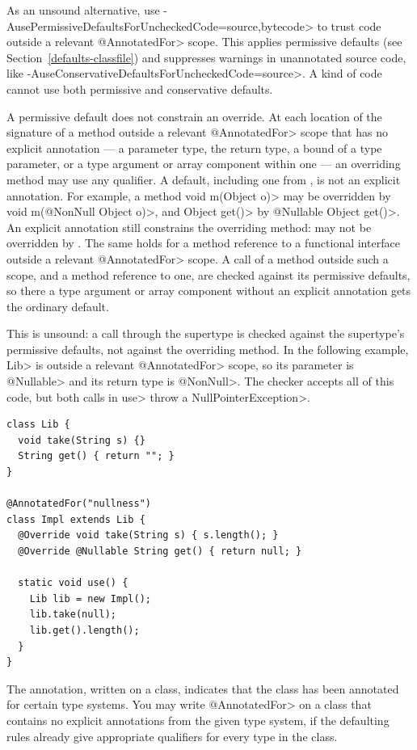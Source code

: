 As an unsound alternative, use
\<-AusePermissiveDefaultsForUncheckedCode=source,bytecode> to trust code outside
a relevant \<@AnnotatedFor> scope.  This applies permissive defaults (see
Section~\ref{defaults-classfile}) and suppresses warnings in unannotated source code,
like \<-AuseConservativeDefaultsForUncheckedCode=source>.  A kind of code cannot
use both permissive and conservative defaults.

A permissive default does not constrain an override.  At each location of the
signature of a method outside a relevant \<@AnnotatedFor> scope that has no
explicit annotation --- a parameter type, the return type, a bound of a type
parameter, or a type argument or array component within one --- an
overriding method may use any qualifier.  A default, including one from
, is not an explicit
annotation.  For example, a method
\<void m(Object o)> may be overridden by \<void m(@NonNull Object o)>, and
\<Object get()> by \<@Nullable Object get()>.  An explicit annotation still
constrains the overriding method:   may
not be overridden by .  The same holds for a method
reference to a functional interface outside a relevant \<@AnnotatedFor>
scope.  A call of a method outside such a scope, and a method reference to one,
are checked against its permissive defaults, so there a type argument or array
component without an explicit annotation gets the ordinary default.

This is unsound:  a call through the supertype is checked against the
supertype's permissive defaults, not against the overriding method.  In the
following example, \<Lib> is outside a relevant \<@AnnotatedFor> scope, so
its parameter is \<@Nullable> and its return type is \<@NonNull>.  The
checker accepts all of this code, but both calls in \<use> throw a
\<NullPointerException>.

\begin{Verbatim}
class Lib {
  void take(String s) {}
  String get() { return ""; }
}

@AnnotatedFor("nullness")
class Impl extends Lib {
  @Override void take(String s) { s.length(); }
  @Override @Nullable String get() { return null; }

  static void use() {
    Lib lib = new Impl();
    lib.take(null);
    lib.get().length();
  }
}
\end{Verbatim}

The  annotation, written on a
class, indicates that the class has been annotated for certain type
systems.
You may write \<@AnnotatedFor> on a class that contains no explicit
annotations from the given type system, if the defaulting rules already
give appropriate qualifiers for every type in the class.

